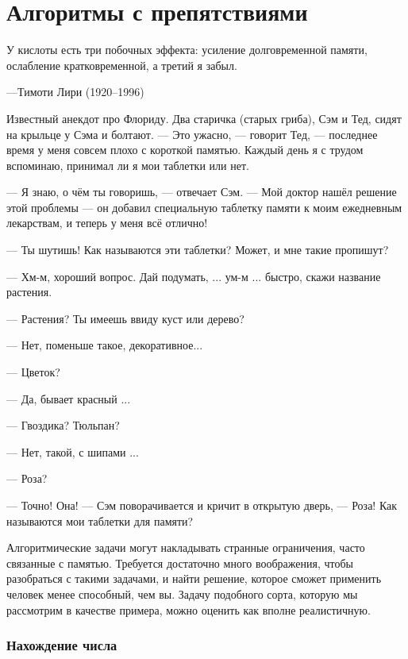 \chapter*{Алгоритмы с препятствиями}

\setlength{\epigraphwidth}{.85\textwidth}
\epigraph{У кислоты есть три побочных эффекта: усиление долговременной памяти, ослабление кратковременной, а третий я забыл.}{---Тимоти Лири (1920--1996)}

Известный анекдот про Флориду.
Два старичка (старых гриба), Сэм и Тед, сидят на крыльце у Сэма и болтают.
--- Это ужасно, --- говорит Тед, --- последнее время у меня совсем плохо с короткой памятью.
Каждый день я с трудом вспоминаю, принимал ли я мои таблетки или нет.

--- Я знаю, о чём ты говоришь, --- отвечает Сэм.
--- Мой доктор нашёл решение этой проблемы --- он добавил специальную таблетку памяти к моим ежедневным лекарствам, и теперь у меня всё отлично!

--- Ты шутишь! Как называются эти таблетки? Может, и мне такие пропишут?

--- Хм-м, хороший вопрос.
Дай подумать, ... ум-м ... быстро, скажи название растения.

--- Растения? Ты имеешь ввиду куст или дерево?

--- Нет, поменьше такое, декоративное...

--- Цветок?

--- Да, бывает красный ...

--- Гвоздика? Тюльпан?

--- Нет, такой, с шипами ...

--- Роза?

--- Точно! Она! --- Сэм поворачивается и кричит в открытую дверь, --- Роза! Как называются мои таблетки для памяти?

\medskip

Алгоритмические задачи могут накладывать странные ограничения, часто связанные с памятью.
Требуется достаточно много воображения, чтобы разобраться с такими задачами, и найти решение, которое сможет применить человек менее способный, чем вы.
Задачу подобного сорта, которую мы рассмотрим в качестве примера, можно оценить как вполне реалистичную.

\subsection*{Нахождение числа}%

